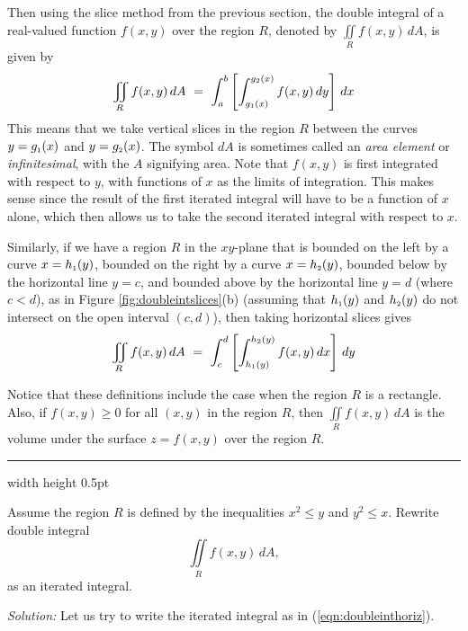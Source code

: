 Then using the slice method from the previous section, the double integral of a real-valued function $f(x,y)$
over the region $R$, denoted by $\displaystyle\iint\limits_{R} f(x,y)\,dA$, is given by\index{$\iint$}
\begin{equation}\label{eqn:doubleintvert}
 \iint\limits_{R} f(x,y)\,dA ~=~ \int_a^b \left[ \int_{g_{\scriptscriptstyle 1}(x)}^{g_{\scriptscriptstyle 2}(x)} f(x,y)\,dy \right] \,dx
\end{equation}
This means that we take vertical slices in the region $R$ between the curves $y=g_{\scriptscriptstyle 1}(x)$ and $y=g_{\scriptscriptstyle 2}(x)$.
The symbol $dA$ is sometimes called an \emph{area element} or \emph{infinitesimal}, with the $A$ signifying area.
Note that $f(x,y)$ is first integrated with respect to $y$, with functions of $x$ as the limits of
integration. This makes sense since the result of the first iterated integral will have to be a function of $x$
alone, which then allows us to take the second iterated integral with respect to $x$.

Similarly, if we have a region $R$ in the $xy$-plane that is bounded on the left by a curve $x=h_{\scriptscriptstyle 1}(y)$,
bounded on the right by a curve $x=h_{\scriptscriptstyle 2}(y)$, bounded below by the horizontal line $y=c$, and bounded above by
the horizontal line $y=d$ (where $c < d$), as in Figure \ref{fig:doubleintslices}(b) (assuming that
$h_{\scriptscriptstyle 1}(y)$ and $h_{\scriptscriptstyle 2}(y)$ do not intersect on the open interval $(c,d)$), then taking horizontal slices
gives
\begin{equation}\label{eqn:doubleinthoriz}
 \iint\limits_{R} f(x,y)\,dA ~=~ \int_c^d \left[ \int_{h_{\scriptscriptstyle 1}(y)}^{h_{\scriptscriptstyle 2}(y)} f(x,y)\,dx \right] \,dy
\end{equation}

Notice that these definitions
include the case when the region $R$ is a rectangle. Also, if $f(x,y) \ge 0$ for all $(x,y)$ in the region $R$,
then $\iint\limits_{R} f(x,y)\,dA$ is the volume under the surface $z=f(x,y)$ over the region $R$.

\medskip
\hrule width \textwidth height 0.5pt
\begin{exmp}\label{exmp:doube-iterated}
Assume the region $R$ is defined by the inequalities $x^2\le y$ and $y^2\le x$.
Rewrite double integral 
 \[\iint\limits_{R} f(x,y)\,dA,\]
as an iterated integral.
\end{exmp}

\smallskip
 
\par\noindent \emph{Solution:} Let us try to write the iterated integral as in (\ref{eqn:doubleinthoriz}).

